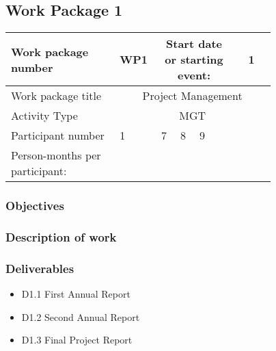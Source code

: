 \subsection{Work Package 1}

\begin{table}[hbpt]\centering
	\begin{tabular}{|p{0.35\linewidth}|p{0.06\linewidth}|p{0.06\linewidth}|p{0.06\linewidth}|
                     p{0.06\linewidth}|p{0.06\linewidth}|p{0.06\linewidth}|p{0.06\linewidth}|}\hline
		 Work package number& WP1 &
		 \multicolumn{4}{|c|}{Start date or starting event:}{}&
		 \multicolumn{2}{|c|}{                        1  }{}\\\hline
		 Work package title&\multicolumn{7}{|c|}{ Project Management }{}\\\hline
		 Activity Type&\multicolumn{7}{|c|}{ MGT }{}\\\hline
		 Participant number & 1 & 7 & 8 & 9 & ~ & ~ & ~ \\\hline
		 Person-months per participant: &  & ~ & ~ & ~ & ~ & ~ & ~ \\\hline
	\end{tabular}
\end{table}

\subsubsection{Objectives}

\subsubsection{Description of work}

\subsubsection{Deliverables}

\begin{itemize}
	\item D1.1 First Annual Report
	\item D1.2 Second Annual Report
	\item D1.3 Final Project Report
\end{itemize}